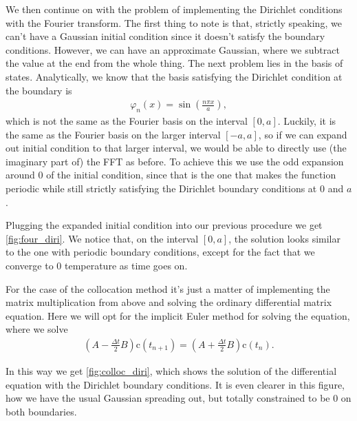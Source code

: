 \documentclass[10pt,a4paper,twocolumn]{article}
\renewcommand{\vec}[1]{\bm{\mathrm{#1}}}
\begin{document}
We then continue on with the problem of implementing the Dirichlet conditions with the Fourier transform. The first thing to note is that, strictly speaking, we can't have a Gaussian initial condition since it doesn't satisfy the boundary conditions. However, we can have an approximate Gaussian, where we subtract the value at the end from the whole thing. The next problem lies in the basis of states. Analytically, we know that the basis satisfying the Dirichlet condition at the boundary is
%
\begin{align}
    \varphi_n (x) = \sin \left( \frac{n \pi x}{a} \right),
\end{align}
%
which is not the same as the Fourier basis on the interval $[0,a]$. Luckily, it is the same as the Fourier basis on the larger interval $[-a, a]$, so if we can expand out initial condition to that larger interval, we would be able to directly use (the imaginary part of) the FFT as before. To achieve this we use the odd expansion around 0 of the initial condition, since that is the one that makes the function periodic while still strictly satisfying the Dirichlet boundary conditions at $0$ and $a$.

Plugging the expanded initial condition into our previous procedure we get \cref{fig:four_diri}. We notice that, on the interval $[0,a]$, the solution looks similar to the one with periodic boundary conditions, except for the fact that we converge to $0$ temperature as time goes on.

For the case of the collocation method it's just a matter of implementing the matrix multiplication from above and solving the ordinary differential matrix equation. Here we will opt for the implicit Euler method for solving the equation, where we solve
%
\begin{align}
    \left(A - \frac{\Delta t}{2} B\right) \vec{c}(t_{n+1}) = \left(A + \frac{\Delta t}{2} B\right) \vec{c}(t_{n}).
\end{align}

In this way we get \cref{fig:colloc_diri}, which shows the solution of the differential equation with the Dirichlet boundary conditions. It is even clearer in this figure, how we have the usual Gaussian spreading out, but totally constrained to be $0$ on both boundaries.

\nocite{1}
\nocite{2}

\printbibliography
\end{document}
